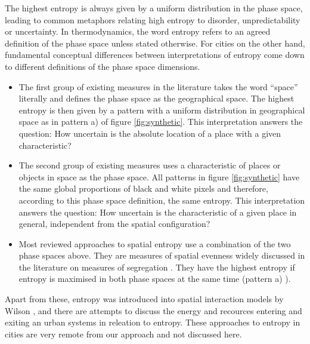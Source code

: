 \documentclass[fleqn,10pt]{wlscirep}
\begin{document}
The highest entropy is always given by a uniform distribution in the phase space, leading to common metaphors relating high entropy to disorder, unpredictability or uncertainty\cite{EntropyMetaphors}. In thermodynamics, the word entropy refers to an agreed definition of the phase space unless stated otherwise. For cities on the other hand, fundamental conceptual differences between interpretations of entropy come down to different definitions of the phase space dimensions.
\begin{itemize}
\item{The first group of existing measures in the literature takes the word ``space'' literally and defines the phase space as the geographical space.\cite{SpatialEntropyBatty1974,Batty2010,BattyMorphetKiril2012} The highest entropy is then given by a pattern with a uniform distribution in geographical space as in pattern a) of figure \ref{fig:synthetic}. This interpretation answers the question: How uncertain is the absolute location of a place with a given characteristic?}

\item{The second group of existing measures uses a characteristic of places or objects in space as the phase space.\cite{AgustGudmundsson2013} All patterns in figure \ref{fig:synthetic} have the same global proportions of black and white pixels and therefore, according to this phase space definition, the same entropy.
This interpretation answers the question: How uncertain is the characteristic of a given place in general, independent from the spatial configuration?}

\item{Most reviewed approaches to spatial entropy use a combination of the two phase spaces above. They are measures of spatial evenness widely discussed in the literature on measures of segregation \cite{Theil1971,duncan1955,GiniIndex,DIndex,EtaSquared,White1983,morgan1983,Logan,LiebersonCarter,MasseyDanton,WongSegregation,Taeuber1969}. They have the highest entropy if entropy is maximised in both phase spaces at the same time (pattern a) ).}
\end{itemize}

Apart from these, entropy was introduced into spatial interaction models by Wilson \cite{Wilson1970}, and there are attempts to discuss the energy and recources entering and exiting an urban systems in releation to entropy.\cite{EcosystemEntropy} These approaches to entropy in cities are very remote from our approach and not discussed here.   
\end{document}
